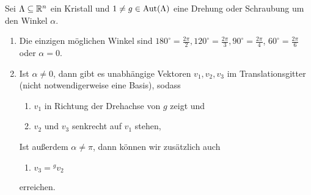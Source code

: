 \begin{theorem}
Sei $\Lambda\subseteq\mathbb{R}^n$ ein Kristall und $1\neq g\in\operatorname{Aut}(\Lambda)$ eine Drehung oder Schraubung um den Winkel $\alpha$.
\begin{enumerate}
\item Die einzigen möglichen Winkel sind $180^\circ=\frac{2\pi}{2}, 120^\circ= \frac{2\pi}{3}, 90^\circ=\frac{2\pi}{4}$, $60^\circ=\frac{2\pi}{6}$ oder $\alpha=0$.
\item Ist $\alpha\neq 0$, dann gibt es unabhängige Vektoren $v_1,v_2,v_3$ im Translationsgitter (nicht notwendigerweise eine Basis), sodass
\begin{enumerate}
\item $v_1$ in Richtung der Drehachse von $g$ zeigt und
\item $v_2$ und $v_3$ senkrecht auf $v_1$ stehen,
\end{enumerate}
Ist außerdem $\alpha\neq\pi$, dann können wir zusätzlich auch
\begin{enumerate}[resume]
\item $v_3={^g v_2}$
\end{enumerate}
erreichen.
\end{enumerate}
\end{theorem}
